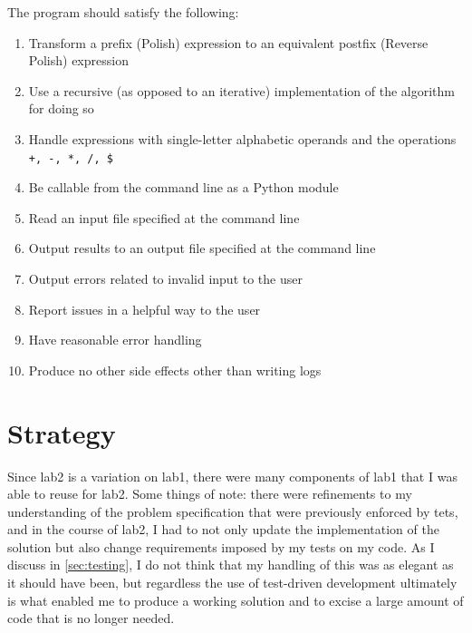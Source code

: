 \documentclass[10pt,letterpaper,final]{report}
\begin{document}
The program should satisfy the following:

\begin{enumerate}
  \item Transform a prefix (Polish) expression to an equivalent postfix (Reverse Polish) expression
  \item Use a recursive (as opposed to an iterative) implementation of the algorithm for doing so
  \item Handle expressions with single-letter alphabetic operands and the operations \verb|+, -, *, /, $|
  \item Be callable from the command line as a Python module
  \item Read an input file specified at the command line
  \item Output results to an output file specified at the command line
  \item Output errors related to invalid input to the user
  \item Report issues in a helpful way to the user
  \item Have reasonable error handling
  \item Produce no other side effects other than writing logs
\end{enumerate}

\section{Strategy}\label{sec:strategy}

Since lab2 is a variation on lab1, there were many components of lab1 that I was able to reuse for lab2. Some things of note: there were refinements to my understanding of the problem specification that were previously enforced by tets, and in the course of lab2, I had to not only update the implementation of the solution but also change requirements imposed by my tests on my code. As I discuss in \ref{sec:testing}, I do not think that my handling of this was as elegant as it should have been, but regardless the use of test-driven development ultimately is what enabled me to produce a working solution and to excise a large amount of code that is no longer needed.
\end{document}
